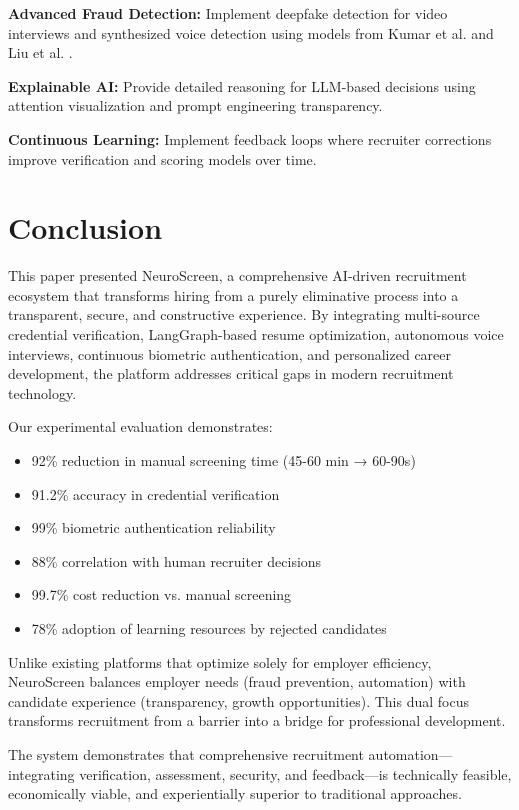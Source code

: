 \documentclass[conference]{IEEEtran}
\begin{document}
\textbf{Advanced Fraud Detection:} Implement deepfake detection for video interviews and synthesized voice detection using models from Kumar et al. \cite{kumar2022novel} and Liu et al. \cite{liu2022blockchain}.

\textbf{Explainable AI:} Provide detailed reasoning for LLM-based decisions using attention visualization and prompt engineering transparency.

\textbf{Continuous Learning:} Implement feedback loops where recruiter corrections improve verification and scoring models over time.

\section{Conclusion}

This paper presented NeuroScreen, a comprehensive AI-driven recruitment ecosystem that transforms hiring from a purely eliminative process into a transparent, secure, and constructive experience. By integrating multi-source credential verification, LangGraph-based resume optimization, autonomous voice interviews, continuous biometric authentication, and personalized career development, the platform addresses critical gaps in modern recruitment technology.

Our experimental evaluation demonstrates:
\begin{itemize}
    \item 92\% reduction in manual screening time (45-60 min → 60-90s)
    \item 91.2\% accuracy in credential verification
    \item 99\% biometric authentication reliability
    \item 88\% correlation with human recruiter decisions
    \item 99.7\% cost reduction vs. manual screening
    \item 78\% adoption of learning resources by rejected candidates
\end{itemize}

Unlike existing platforms that optimize solely for employer efficiency, NeuroScreen balances employer needs (fraud prevention, automation) with candidate experience (transparency, growth opportunities). This dual focus transforms recruitment from a barrier into a bridge for professional development.

The system demonstrates that comprehensive recruitment automation—integrating verification, assessment, security, and feedback—is technically feasible, economically viable, and experientially superior to traditional approaches.
\end{document}
